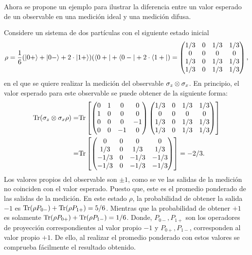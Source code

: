  

Ahora se propone un ejemplo para ilustrar la diferencia entre un valor esperado de un observable en una medición ideal y una medición difusa. 


Considere un sistema de dos partículas con el siguiente estado inicial \[\rho= \dfrac{1}{6}(|0+\rangle+|0-\rangle+2 \cdot|1+\rangle)(\langle0+|+\langle0-|+2 \cdot\langle1+|)=\begin{pmatrix}
    1/3&0&1/3&1/3\\
    0&0&0&0\\
    1/3&0&1/3&1/3\\
    1/3&0&1/3&1/3\\
\end{pmatrix},\] en el que se quiere realizar la medición del observable $\sigma_z\otimes\sigma_x$. En principio, el valor esperado para este observable se puede obtener de la siguiente forma:
\[\begin{split}
    {\rm Tr}(\sigma_z\otimes\sigma_x \rho) =& {\rm Tr}\left[ \begin{pmatrix}
    0&1&0&0\\
    1&0&0&0\\
    0&0&0&-1\\
    0&0&-1&0\\
\end{pmatrix}\begin{pmatrix}
    1/3&0&1/3&1/3\\
    0&0&0&0\\
    1/3&0&1/3&1/3\\
    1/3&0&1/3&1/3\\
\end{pmatrix}\right]\\
=& {\rm Tr}\left[ \begin{pmatrix}
    0&0&0&0\\
    1/3&0&1/3&1/3\\
    -1/3&0&-1/3&-1/3\\
    -1/3&0&-1/3&-1/3\\
\end{pmatrix}\right]=-2/3. \end{split}\] Los valores propios del observable son $\pm 1$, como se ve las salidas de la medición no coinciden con el valor esperado. Puesto que, este es el promedio ponderado de las salidas de la medición.  En este estado $\rho$, la probabilidad de obtener  la salida $-1$ es ${\rm Tr}(\rho P_{0-})+{\rm Tr}(\rho P_{1+})=5/6$. Mientras que la probabilidad de obtener $+1$ es solamente ${\rm Tr}(\rho P_{0+})+{\rm Tr}(\rho P_{1-})=1/6$. Donde, $ P_{0-}, P_{1+}$ son los operadores de proyección correspondientes al valor propio $-1$ y $ P_{0+}, P_{1-}$, corresponden al valor propio $+1$. De ello, al realizar el promedio ponderado con estos valores se comprueba fácilmente el resultado obtenido.

